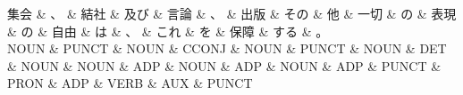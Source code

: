 \documentclass[tikz,border=5pt]{standalone}
\begin{document}
\normalsize
\begin{dependency}[edge unit distance=12.0pt]
    \begin{deptext}[column sep=1em]
        集会 \& 、 \& 結社 \& 及び \& 言論 \& 、 \& 出版 \& その \& 他 \& 一切 \& の \& 表現 \& の \& 自由 \& は \& 、 \& これ \& を \& 保障 \& する \& 。\\
        NOUN \& PUNCT \& NOUN \& CCONJ \& NOUN \& PUNCT \& NOUN \& DET \& NOUN \& NOUN \& ADP \& NOUN \& ADP \& NOUN \& ADP \& PUNCT \& PRON \& ADP \& VERB \& AUX \& PUNCT\\
    \end{deptext}
\end{dependency}
\end{document}
